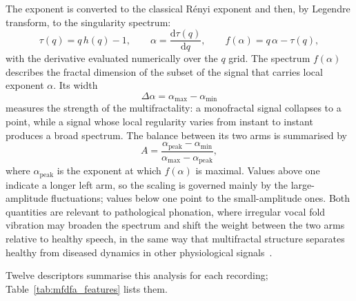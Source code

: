 \documentclass[runningheads]{llncs}
\begin{document}
  The exponent is converted to the classical Rényi exponent and then, by Legendre transform, to the singularity spectrum:
  \begin{equation}
  \tau(q) = q\,h(q) - 1, \qquad
  \alpha = \frac{\mathrm{d}\tau(q)}{\mathrm{d}q}, \qquad
  f(\alpha) = q\,\alpha - \tau(q) ,
  \end{equation}
  with the derivative evaluated numerically over the $q$ grid. The spectrum $f(\alpha)$ describes the fractal dimension of the subset of the signal that carries local exponent $\alpha$. Its width
  \begin{equation}
  \Delta\alpha = \alpha_{\max} - \alpha_{\min}
  \end{equation}
  measures the strength of the multifractality: a monofractal signal collapses to a point, while a signal whose local regularity varies from instant to instant produces a broad spectrum. The balance between its two arms is summarised by
  \begin{equation}
  A = \frac{\alpha_{\mathrm{peak}} - \alpha_{\min}}{\alpha_{\max} - \alpha_{\mathrm{peak}}} ,
  \end{equation}
  where $\alpha_{\mathrm{peak}}$ is the exponent at which $f(\alpha)$ is maximal. Values above one indicate a longer left arm, so the scaling is governed mainly by the large-amplitude fluctuations; values below one point to the small-amplitude ones. Both quantities are relevant to pathological phonation, where irregular vocal fold vibration may broaden the spectrum and shift the weight between the two arms relative to healthy speech, in the same way that multifractal structure separates healthy from diseased dynamics in other physiological signals~\cite{ivanov1999}.

  Twelve descriptors summarise this analysis for each recording; Table~\ref{tab:mfdfa_features} lists them.
\end{document}
